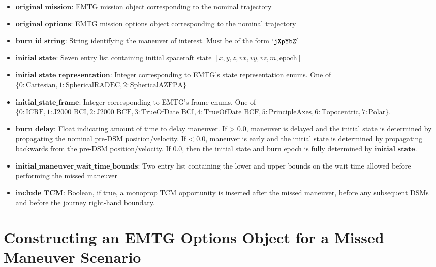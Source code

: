 \documentclass[11pt]{article}
\begin{document}
\begin{itemize}
	\item $\mathtt{\mathbf{original\_mission}}$: EMTG mission object corresponding to the nominal trajectory
	\item $\mathtt{\mathbf{original\_options}}$: EMTG mission options object corresponding to the nominal trajectory
	\item $\mathtt{\mathbf{burn\_id\_string}}$: String identifying the maneuver of interest. Must be of the form $\mathtt{`jXpYbZ'}$
	\item $\mathtt{\mathbf{initial\_state}}$: Seven entry list containing initial spaceraft state $\left[x, y, z, vx, vy, vz, m, \text{epoch}\right]$
	\item $\mathtt{\mathbf{initial\_state\_representation}}$: Integer corresponding to EMTG's state representation enums. One of $\{0: \text{Cartesian}, 1: \text{SphericalRADEC}, 2: \text{SphericalAZFPA}\}$
	\item $\mathtt{\mathbf{initial\_state\_frame}}$: Integer corresponding to EMTG's frame enums. One of $\{0: \text{ICRF}, 1: \text{J2000\_BCI}, 2: \text{J2000\_BCF}, 3: \text{TrueOfDate\_BCI}, 4: \text{TrueOfDate\_BCF}, 5: \text{PrincipleAxes}, 6: \text{Topocentric}, 7: \text{Polar}\}$.
	\item $\mathtt{\mathbf{burn\_delay}}$: Float indicating amount of time to delay maneuver. If > 0.0, maneuver is delayed and the initial state is determined by propagating the nominal pre-\ac{DSM} position/velocity. If < 0.0, maneuver is early and the initial state is determined by propagating backwards from the pre-\ac{DSM} position/velocity. If 0.0, then the initial state and burn epoch is fully determined by $\mathtt{\mathbf{initial\_state}}$.
	\item $\mathtt{\mathbf{initial\_maneuver\_wait\_time\_bounds}}$: Two entry list containing the lower and upper bounds on the wait time allowed before performing the missed maneuver
	\item $\mathtt{\mathbf{include\_TCM}}$: Boolean, if true, a monoprop TCM opportunity is inserted after the missed maneuver, before any subsequent \ac{DSM}s and before the journey right-hand boundary.
\end{itemize}

\section{Constructing an EMTG Options Object for a Missed Maneuver Scenario}
\end{document}
